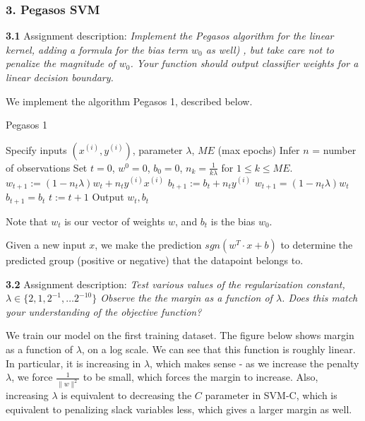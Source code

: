 \documentclass[10pt]{article}
\newcommand{\ds}{\displaystyle}
\begin{document}
\subsubsection*{3. Pegasos SVM}
\textbf{3.1}
Assignment description: \emph{Implement the Pegasos algorithm for the linear kernel, adding a formula for the bias term $\ds w_0$ as well) , but take care not to penalize the magnitude of $\ds w_0$. Your function should output classifier
weights for a linear decision boundary.}

We implement the algorithm Pegasos 1, described below.

\begin{algorithm}
\caption{Pegasos 1}
\begin{algorithmic}[1]
\State Specify inputs $\ds (x^{(i)}, y^{(i)}) $, parameter $\ds\lambda$, $\ds ME$ (max epochs)
\State Infer $\ds n$ = number of observations
\State Set $\ds t=0$, $\ds w^{0}=0$, $\ds b_0 = 0$, $\ds n_k = \frac{1}{k\lambda}$ for $\ds 1\leq k \leq ME$.
\While{$\ds t < ME$}
\If{$\ds y^{(i)}(w_t^T\cdot x^{(i)} + b_t) <1$}
\State $\ds w_{t+1}:= (1-n_t\lambda)w_t + n_ty^{(i)}x^{(i)}$
\State $\ds b_{t+1}:= b_t + n_ty^{(i)}$
\Else
\State $\ds w_{t+1} = (1-n_t\lambda)w_t$
\State $\ds b_{t+1} = b_t$
\EndIf{}
\State $\ds t:=t+1$
\EndFor{}
\EndWhile{}
Output $\ds w_t, b_t$
\EndProcedure
\end{algorithmic}
\end{algorithm}

Note that $\ds w_t$ is our vector of weights $\ds w$, and $\ds b_t$ is the bias $\ds w_0$.

Given a new input $\ds x$, we make the prediction $\ds sgn(w^T\cdot x + b)$ to determine the predicted group (positive or negative) that the datapoint belongs to.

\medskip

\textbf{3.2} Assignment description: \emph{Test various values of the regularization constant, $\ds \lambda \in\{2, 1, 2^{-1}, \dots 2^{-10}\}$
Observe the the margin as a function of $\ds\lambda$. Does this match your understanding
of the objective function?}

We train our model on the first training dataset. The figure below shows margin as a function of $\ds \lambda$, on a log scale. We can see that this function is roughly linear. In particular, it is increasing in $\ds \lambda$, which makes sense - as we increase the penalty $\ds \lambda$, we force $\ds \frac{1}{\|w\|^2}$ to be small, which forces the margin to increase. Also, increasing $\ds \lambda$ is equivalent to decreasing the $\ds C$ parameter in SVM-C, which is equivalent to penalizing slack variables less, which gives a larger margin as well.
\end{document}
